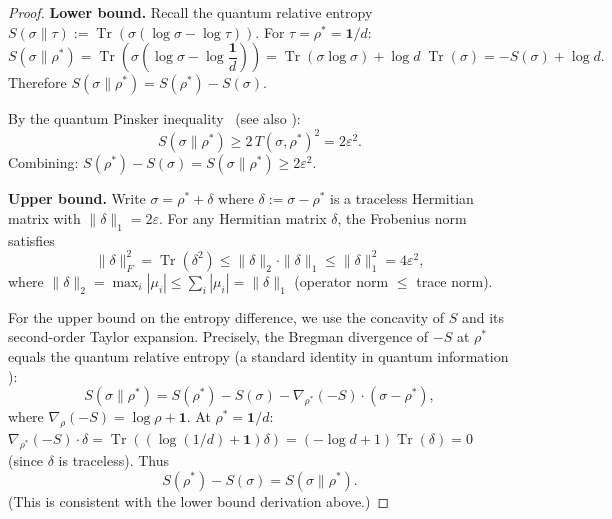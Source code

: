 \documentclass[12pt,a4paper]{article}
\DeclareMathOperator{\Tr}{Tr}
\begin{document}
\begin{proof}
\textbf{Lower bound.} Recall the quantum relative entropy
$S(\sigma\|\tau):=\Tr(\sigma(\log\sigma-\log\tau))$.  For $\tau=\rho^*=\mathbf{1}/d$:
\[
  S(\sigma\|\rho^*)
  = \Tr\!\left(\sigma\!\left(\log\sigma - \log\frac{\mathbf{1}}{d}\right)\right)
  = \Tr(\sigma\log\sigma) + \log d\;\Tr(\sigma)
  = -S(\sigma) + \log d.
\]
Therefore $S(\sigma\|\rho^*) = S(\rho^*) - S(\sigma)$.

By the quantum Pinsker inequality~\cite{umegaki1962} (see also \cite{nielsen2000}):
\begin{equation}\label{eq:pinsker}
  S(\sigma\|\rho^*) \geq 2\,T(\sigma,\rho^*)^2 = 2\varepsilon^2.
\end{equation}
Combining: $S(\rho^*)-S(\sigma) = S(\sigma\|\rho^*)\geq 2\varepsilon^2$.

\textbf{Upper bound.} Write $\sigma = \rho^* + \delta$ where $\delta:=\sigma-\rho^*$
is a traceless Hermitian matrix with $\|\delta\|_1 = 2\varepsilon$.
For any Hermitian matrix $\delta$, the Frobenius norm satisfies
\begin{equation}\label{eq:norm_bound}
  \|\delta\|_F^2 = \Tr(\delta^2) \leq \|\delta\|_2\cdot\|\delta\|_1
               \leq \|\delta\|_1^2 = 4\varepsilon^2,
\end{equation}
where $\|\delta\|_2 = \max_i|\mu_i|\leq\sum_i|\mu_i|=\|\delta\|_1$
(operator norm $\leq$ trace norm).

For the upper bound on the entropy difference, we use the concavity of $S$
and its second-order Taylor expansion.  Precisely, the Bregman divergence of
$-S$ at $\rho^*$ equals the quantum relative entropy (a standard identity in
quantum information \cite{vedral1997}):
\begin{equation}\label{eq:bregman}
  S(\sigma\|\rho^*) = S(\rho^*) - S(\sigma) - \nabla_{\rho^*}(-S)\cdot(\sigma-\rho^*),
\end{equation}
where $\nabla_\rho(-S) = \log\rho + \mathbf{1}$.  At $\rho^*=\mathbf{1}/d$:
$\nabla_{\rho^*}(-S)\cdot\delta = \Tr((\log(1/d)+\mathbf{1})\delta) =
(-\log d+1)\Tr(\delta) = 0$ (since $\delta$ is traceless).  Thus
\begin{equation}\label{eq:bregman2}
  S(\rho^*) - S(\sigma) = S(\sigma\|\rho^*).
\end{equation}
(This is consistent with the lower bound derivation above.)


\end{proof}
\end{document}
